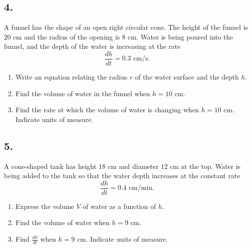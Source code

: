 \documentclass[12pt,a4paper]{article}
\begin{document}
\subsection*{4. \quad [20 points]}

A funnel has the shape of an open right circular cone. The height of the funnel is $20\text{ cm}$ and the radius of the opening is $8\text{ cm}$. Water is being poured into the funnel, and the depth of the water is increasing at the rate
\[
\frac{dh}{dt}=0.3\text{ cm/s}.
\]

\begin{enumerate}[label=(\alph*)]
    \item Write an equation relating the radius $r$ of the water surface and the depth $h$.
    
    \item Find the volume of water in the funnel when $h=10\text{ cm}$.
    
    \item Find the rate at which the volume of water is changing when $h=10\text{ cm}$. Indicate units of measure.
\end{enumerate}

\subsection*{5. \quad [20 points]}

A cone-shaped tank has height $18\text{ cm}$ and diameter $12\text{ cm}$ at the top. Water is being added to the tank so that the water depth increases at the constant rate
\[
\frac{dh}{dt}=0.4\text{ cm/min}.
\]

\begin{enumerate}[label=(\alph*)]
    \item Express the volume $V$ of water as a function of $h$.
    
    \item Find the volume of water when $h=9\text{ cm}$.
    
    \item Find $\frac{dV}{dt}$ when $h=9\text{ cm}$. Indicate units of measure.
\end{enumerate}
\end{document}
